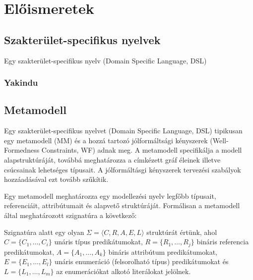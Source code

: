 \chapter{Előismeretek}

\section{Szakterület-specifikus nyelvek}
Egy szakterület-specifikus nyelv (Domain Specific Language, DSL)

\subsection{Yakindu}

\section{Metamodell}

Egy szakterület-specifikus nyelvet (Domain Specific Language, DSL) tipikusan egy metamodell (MM) és a hozzá tartozó jólformáltsági kényszerek (Well-Formedness Constraints, WF) adnak meg. A metamodell specifikálja a modell alapstruktúráját, továbbá meghatározza a címkézett gráf  éleinek illetve csúcsainak lehetséges típusait. A jólformáltásgi kényszerek tervezési szabályok hozzáadásával ezt tovább szűkítik.

Egy metamodell meghatározza egy modellezési nyelv legfőbb típusait, referenciáit, attribútumait és alapvető struktúráját. Formálisan a metamodell által meghatározott szignatúra a következő:

\begin{definition}[Szignatúra]
Szignatúra alatt egy olyan $\Sigma = \langle\mathit{C}, \mathit{R}, \mathit{A}, \mathit{E}, \mathit{L}\rangle$ struktúrát értünk, ahol $C = \{C_1, \ldots, C_i\}$ unáris típus predikátumokat, $R = \{R_1, \ldots, R_j\}$ bináris referencia predikátumokat, $A = \{A_1, \ldots, A_k\}$ bináris attribútum predikátumokat, $E = \{E_1, \ldots, E_l\}$ unáris enumeráció (felsorolható típus) predikátumokat és $L = \{L_1, \ldots, L_m\}$ az enumerációkat alkotó literálokat jelölnek.
\end{definition}



